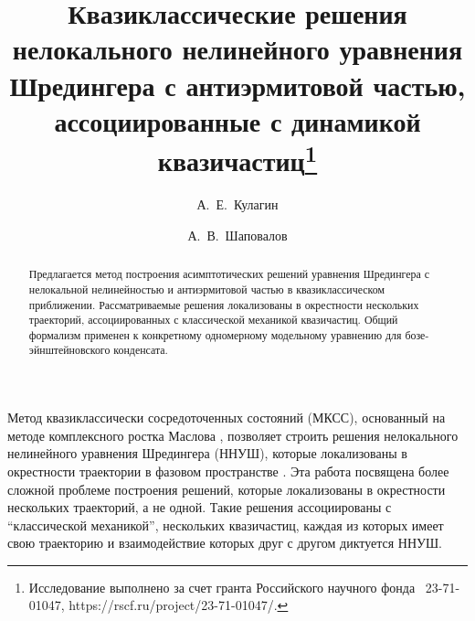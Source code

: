 \usepackage{todonotes}

\usepackage[russian]{nla}


\fi

\title{Квазиклассические решения нелокального нелинейного уравнения Шредингера с антиэрмитовой частью, ассоциированные с динамикой квазичастиц\thanks{Исследование выполнено за счет гранта Российского научного фонда \textnumero~23-71-01047, https://rscf.ru/project/23-71-01047/.}}
\author{А.~Е.~Кулагин  \and  А.~В.~Шаповалов
}


\maketitle

\begin{abstract}
Предлагается метод построения асимптотических решений уравнения Шредингера с нелокальной нелинейностью и антиэрмитовой частью в квазиклассическом приближении. Рассматриваемые решения локализованы в окрестности нескольких траекторий, ассоциированных с классической механикой квазичастиц. Общий формализм применен к конкретному одномерному модельному уравнению для бозе-эйн\-штей\-новс\-ко\-го конденсата.

\end{abstract}


Метод квазиклассически сосредоточенных состояний (МКСС), основанный на методе комплексного ростка Маслова \cite{mas94}, позволяет строить решения нелокального нелинейного уравнения Шредингера (ННУШ), которые локализованы в окрестности траектории в фазовом пространстве \cite{bel02}. Эта работа посвящена более сложной проблеме построения решений, которые локализованы в окрестности нескольких траекторий, а не одной. Такие решения ассоциированы с ``классической механикой'', нескольких квазичастиц, каждая из которых имеет свою траекторию и взаимодействие которых друг с другом диктуется ННУШ.

